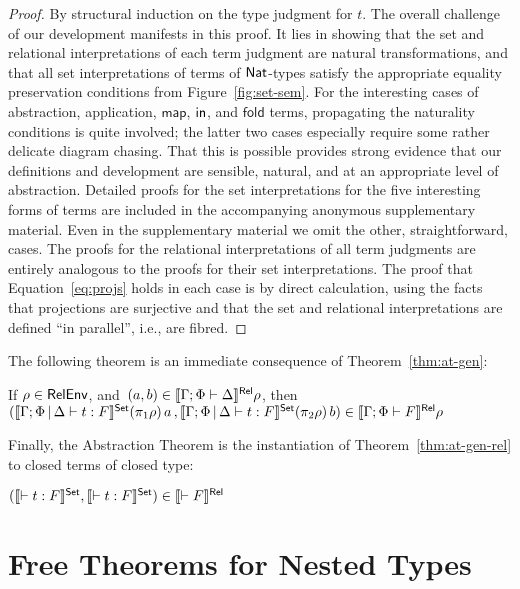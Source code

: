 \documentclass[runningheads]{llncs}
\newcommand{\map}{\mathsf{map}}
\begin{document}
\begin{proof}
By structural induction on the type judgment for $t$. The overall
challenge of our development manifests in this proof. It lies in
showing that the set and relational interpretations of each term
judgment are natural transformations, and that all set interpretations
of terms of $\mathsf{Nat}$-types satisfy the appropriate equality preservation
conditions from Figure~\ref{fig:set-sem}.  For the interesting
cases of abstraction, application, $\map$, $\mathsf{in}$, and $\mathsf{fold}$ terms,
propagating the naturality conditions is quite involved; the latter
two cases especially require some rather delicate diagram
chasing. That this is possible provides strong evidence that our
definitions and development are sensible, natural, and at an
appropriate level of abstraction. {\color{red} Detailed proofs for the
  set interpretations for the five interesting forms of terms are
  included in the accompanying anonymous supplementary material. Even
  in the supplementary material we omit the other, straightforward,
  cases.}  The proofs for the relational interpretations of all term
judgments are entirely analogous to the proofs for their set
interpretations. The proof that Equation~\ref{eq:projs} holds in each
case is by direct calculation, using the facts that projections are
surjective and that the set and relational interpretations are defined
``in parallel'', i.e., are fibred.
\end{proof}

The following theorem is an immediate consequence of
Theorem~\ref{thm:at-gen}:
\begin{theorem}\label{thm:at-gen-rel}
  If
  $\rho \in \mathsf{RelEnv}$,
  and \,$(a, b) \in \llbracket{\Gamma; \Phi \vdash \Delta}\rrbracket^{\mathsf{Rel}} \rho$,
  then\\
  $(\llbracket{\Gamma; \Phi \,|\, \Delta \vdash t : F}\rrbracket^{\mathsf{Set}} (\pi_1 \rho) \,a \, ,
      \llbracket{\Gamma; \Phi \,|\, \Delta \vdash t : F }\rrbracket^{\mathsf{Set}} (\pi_2 \rho) \,b) \in 
    \llbracket{\Gamma; \Phi \vdash F}\rrbracket^{\mathsf{Rel}} \rho$
\end{theorem}
\noindent
Finally, the Abstraction Theorem is the instantiation of
Theorem~\ref{thm:at-gen-rel} to closed terms of closed type:
\begin{theorem}\label{thm:abstraction}
  $(\llbracket{\vdash t : F}\rrbracket^{\mathsf{Set}},\llbracket{\vdash t
  : F}\rrbracket^{\mathsf{Set}}) \in \llbracket{\vdash F}\rrbracket^{\mathsf{Rel}}$
\end{theorem}

\section{Free Theorems for Nested Types}\label{sec:ftnt}
\end{document}
